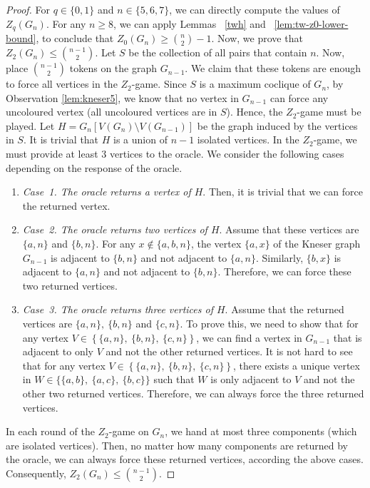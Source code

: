 \documentclass[3p,times,12pt]{article}
\begin{document}
	\begin{proof}
		For $q \in \{0,1\}$ and $n\in \{5,6,7\}$, we can directly compute the values of $Z_q(G_n)$.
		For any $n\geq 8$,  we can apply Lemmas ~\ref{twh} and ~\ref{lem:tw-z0-lower-bound}, to conclude that $Z_0(G_n) \geq \binom{n}{2}-1$. Now, we prove that $Z_2(G_n) \leq \binom{n-1}{2}$. 
		Let $S$ be the collection of all pairs that contain $n$. Now, place $\binom{n-1}{2}$ tokens on the graph $G_{n-1}$. We claim that these tokens are enough to force all vertices in the $Z_2$-game. Since $S$ is a maximum coclique of $G_n$, by Observation \ref{lem:kneser5}, we know that no vertex in $G_{n-1}$ can force any uncoloured vertex (all uncoloured vertices are in $S$). Hence, the $Z_2$-game must be played. Let $H = G_n \left[ V(G_n) \setminus V(G_{n-1}) \right]$ be the graph induced by the vertices in $S$. It is trivial that $H$ is a union of $n-1$ isolated vertices. In the $Z_2$-game, we must provide at least $3$ vertices to the oracle. We consider the following cases depending on the response of the oracle.
		\begin{enumerate}
			\item {\it Case~1. The oracle returns a vertex of $H$}. Then, it is trivial that we can force the returned vertex.
			\item {\it Case~2. The oracle returns two vertices of $H$}. Assume that these vertices are $\{a,n\}$ and $\{b,n\}$. For any $x\not\in \{a,b,n\}$, the vertex $\{a,x\}$ of the Kneser graph $G_{n-1}$ is adjacent to $\{b,n\}$ and not adjacent to $\{a,n\}$. Similarly, $\{b,x\}$ is adjacent to $\{a,n\}$ and not adjacent to $\{b,n\}$. Therefore, we can force these two returned vertices.
			\item {\it Case~3. The oracle returns three vertices of $H$}. Assume that the returned vertices are $\{a,n\},\ \{b,n\}$ and $\{c,n\}$. To prove this, we need to show that for any vertex $V\in \left\{ \{a,n\},\ \{b,n\},\ \{c,n\} \right\}$, we can find a vertex in $G_{n-1}$ that is adjacent to only $V$ and not the other returned vertices. It is not hard to see that for any vertex $V\in \left\{ \{a,n\},\ \{b,n\},\ \{c,n\} \right\}$, there exists a unique vertex in $W\in \{\{a,b\},\ \{a,c\},\ \{b,c\} \}$ such that $W$ is only adjacent to $V$ and not the other two returned vertices. Therefore, we can always force the three returned vertices.
		\end{enumerate}
	
		In each round of the $Z_2$-game on $G_n$, we hand at most three components (which are isolated vertices). Then, no matter how many components are returned by the oracle, we can always force these returned vertices, according the above cases. Consequently, $Z_2(G_n) \leq \binom{n-1}{2}$.
		
	\end{proof}
\end{document}
